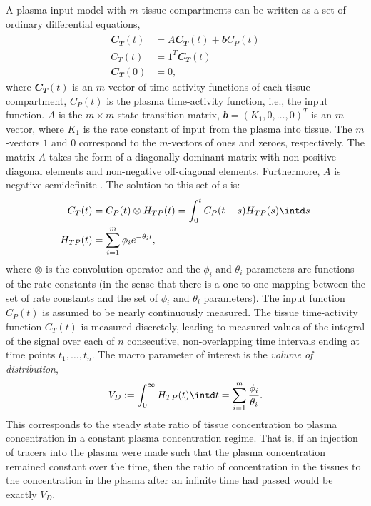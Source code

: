 A plasma input model with $m$ tissue compartments can be written as a set of
ordinary differential equations,
\begin{align*}
  \dot{\mathbfit{C}}_{\mathbfit{T}}(t)
  & = A \mathbfit{C}_{\mathbfit{T}}(t) + \mathbfit{b} C_P(t)\\
  C_T(t) & = \mathbfit{1}^T\mathbfit{C}_{\mathbfit{T}}(t) \\
  \mathbfit{C}_{\mathbfit{T}}(0) & = \mathbfit{0},
\end{align*}
where $\mathbfit{C}_{\mathbfit{T}}(t)$ is an $m$-vector of time-activity
functions of each tissue compartment, $C_P(t)$ is the plasma time-activity
function, i.e., the input function. $A$ is the $m \times m$ state transition
matrix, $\mathbfit{b} = (K_1, 0, \dots, 0)^T$ is an $m$-vector, where $K_1$ is
the rate constant of input from the plasma into tissue. The $m$-vectors
$\mathbfit{1}$ and $\mathbfit{0}$ correspond to the $m$-vectors of ones and
zeroes, respectively. The matrix $A$ takes the form of a diagonally dominant
matrix with non-positive diagonal elements and non-negative off-diagonal
elements. Furthermore, $A$ is negative semidefinite \cite{Gunn:2001cx}.  The
solution to this set of \ode{}s is:
\begin{align}
  C_T(t) & = C_P(t) \otimes H_{TP}(t) = \int_0^t C_P(t-s) H_{TP}(s)\intd s
  \label{eq:CT} \\
  H_{TP}(t) & = \sum_{i=1}^m \phi_i e^{-\theta_i t},\notag
\end{align}
where $\otimes$ is the convolution operator and the $\phi_i$ and $\theta_i$
parameters are functions of the rate constants (in the sense that there is a
one-to-one mapping between the set of rate constants and the set of
$\phi_i$ and $\theta_i$ parameters). The input function $C_P(t)$
is assumed to be nearly continuously measured. The tissue time-activity
function $C_T(t)$ is measured discretely, leading to measured values of the
integral of the signal over each of $n$ consecutive, non-overlapping time
intervals ending at time points $t_1, \dots, t_n$.  The macro parameter of
interest is the \emph{volume of distribution},
\begin{equation*}
  V_D := \int_0^{\infty} H_{TP}(t) \intd t = \sum_{i=1}^m
  \frac{\phi_i}{\theta_i}.
\end{equation*}
This corresponds to the steady state ratio of tissue concentration to
plasma concentration in a constant plasma concentration regime. That is, if
an injection of tracers into the plasma were made such that the plasma
concentration remained constant over the time, then the ratio of
concentration in the tissues to the concentration in the plasma after an
infinite time had passed would be exactly $V_D$.

